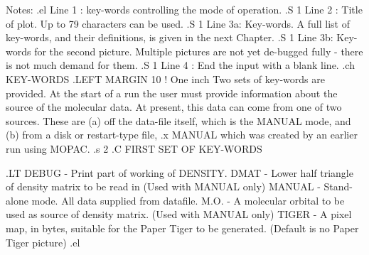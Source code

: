 Notes:
.el
Line 1 : key-words controlling the mode of operation.
.S 1
Line 2 : Title of plot. Up to 79 characters can be used.
.S 1
Line 3a: Key-words. A full list of key-words, and their definitions, is 
given in the next Chapter.
.S 1
Line 3b: Key-words for the second picture. Multiple pictures are not yet 
de-bugged fully - there is not much demand for them.
.S 1
Line 4 : End the input with a blank line.
.ch KEY-WORDS
.LEFT MARGIN 10                 ! One inch
 Two sets of key-words are provided. At the start of a run the user must
provide information about the source of the molecular data. At present,
this data can come from one of two sources. These are (a) off the data-file
itself, which is the MANUAL mode, and (b) from a disk or restart-type file,
.x MANUAL
which was created by an earlier run using MOPAC.
.s 2
.C
 FIRST SET OF KEY-WORDS

.LT
 DEBUG       -  Print part of working of DENSITY.
 DMAT        -  Lower half triangle of density matrix to be read in
                (Used with MANUAL only)
 MANUAL      -  Stand-alone  mode. All data supplied from datafile.
 M.O.        -  A molecular orbital to be used as source of density
                matrix. (Used with MANUAL only)
 TIGER       -  A pixel map, in bytes, suitable for the Paper Tiger
                to be generated. (Default is no Paper Tiger picture)
.el

